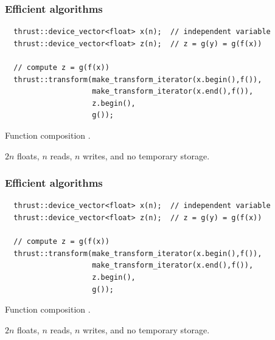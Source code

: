 \documentclass{beamer}
\begin{document}
\begin{frame}[fragile]
\frametitle{Efficient algorithms}

\begin{lstlisting}
  thrust::device_vector<float> x(n);  // independent variable
  thrust::device_vector<float> z(n);  // z = g(y) = g(f(x))

  // compute z = g(f(x))
  thrust::transform(make_transform_iterator(x.begin(),f()),
                    make_transform_iterator(x.end(),f()),
                    z.begin(),
                    g());
\end{lstlisting} 

\bei
\item Function composition \citep{Thrust}.
\item $2n$ floats, $n$ reads, $n$ writes, and no temporary storage.
\ebi
\end{frame}

\begin{frame}[fragile]
\frametitle{Efficient algorithms}

\begin{lstlisting}
  thrust::device_vector<float> x(n);  // independent variable
  thrust::device_vector<float> z(n);  // z = g(y) = g(f(x))

  // compute z = g(f(x))
  thrust::transform(make_transform_iterator(x.begin(),f()),
                    make_transform_iterator(x.end(),f()),
                    z.begin(),
                    g());
\end{lstlisting} 

\bei
\item Function composition \citep{Thrust}.
\item $2n$ floats, $n$ reads, $n$ writes, and no temporary storage.
\ebi
\end{frame}
\end{document}
